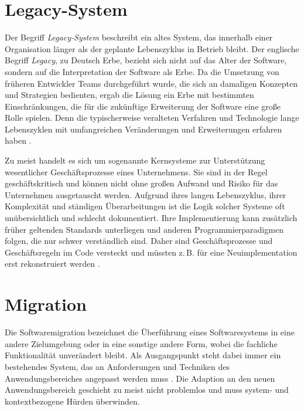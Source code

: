 \section{Legacy-System}

	Der Begriff \textit{Legacy-System} beschreibt ein altes System, das innerhalb einer Organisation länger als der geplante Lebenszyklus in Betrieb bleibt. Der englische Begriff \textit{Legacy}, zu Deutsch Erbe, bezieht sich nicht auf das Alter der Software, sondern auf die Interpretation der Software als Erbe. Da die Umsetzung von früheren Entwickler Teams durchgeführt wurde, die sich an damaligen Konzepten und Strategien bedienten, ergab die Lösung ein Erbe mit bestimmten Einschränkungen, die für die zukünftige Erweiterung der Software eine große Rolle spielen. Denn die typischerweise veralteten Verfahren und Technologie lange Lebenszyklen mit umfangreichen Veränderungen und Erweiterungen erfahren haben \cite{sneed2016softwaremigration}. \bigbreak

	Zu meist handelt es sich um sogenannte Kernsysteme zur Unterstützung wesentlicher Geschäftsprozesse eines Unternehmens. Sie sind in der Regel geschäftskritisch und können nicht ohne großen Aufwand und Risiko für das Unternehmen ausgetauscht werden. Aufgrund ihres langen Lebenszyklus, ihrer Komplexität und ständigen Überarbeitungen ist die Logik solcher Systeme oft unübersichtlich und schlecht dokumentiert. Ihre Implementierung kann zusätzlich früher geltenden Standards unterliegen und anderen Programmierparadigmen folgen, die nur schwer verständlich sind. Daher sind Geschäftsprozesse und Geschäftsregeln im Code versteckt und müssten z.\,B. für eine Neuimplementation erst rekonstruiert werden \cite{martens2016ablosung}.

\section{Migration} \label{ssub:migration}

	Die Softwaremigration bezeichnet die Überführung eines Softwaresystems in eine andere Zielumgebung oder in eine sonstige andere Form, wobei die fachliche Funktionalität unverändert bleibt. Als Ausgangspunkt steht dabei immer ein bestehendes System, das an Anforderungen und Techniken des Anwendungsbereiches angepasst werden muss \cite{sneed2016softwaremigration}. Die Adaption an den neuen Anwendungsbereich geschieht zu meist nicht problemlos und muss system- und kontextbezogene Hürden überwinden. 

